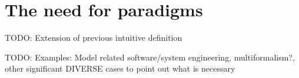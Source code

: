 \section{The need for paradigms}
\label{sec:1}

TODO: Extension of previous intuitive definition


TODO: Examples: Model related software/system engineering, multiformalism?, other significant DIVERSE cases to point out what is necessary
